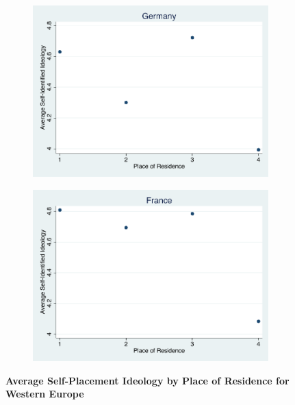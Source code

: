 \documentclass[12pt, titlepage]{article}
\newcommand\tb{\textbf}
\begin{document}
\begin{appendices}
\begin{figure}[H]
	\centering
	\begin{subfigure}[b]{0.475\textwidth}
		\centering
		\includegraphics[width=\textwidth]{Ideology/Germany}
	\end{subfigure}
	\hfill
	\begin{subfigure}[b]{0.475\textwidth}  
		\centering 
		\includegraphics[width=\textwidth]{Ideology/France}
	\end{subfigure}
	\caption[ Western Europe]
	{\tb{ Average Self-Placement Ideology by Place of Residence for Western Europe} }
	\label{fig:mean and std of nets}
\end{figure}


\end{appendices}
\end{document}
